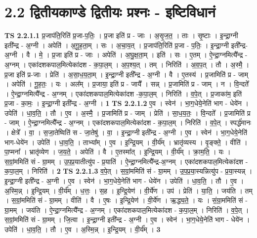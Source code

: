 \documentclass[17pt]{extarticle}
\begin{document}
\section*{ 2.2     द्वितीयकाण्डे द्वितीयः प्रश्नः - इष्टिविधानं }
                                \textbf{ TS 2.2.1.1} \newline
                  प्र॒जाप॑ति॒रिति॑ प्र॒जा-प॒तिः॒ । प्र॒जा इति॑ प्र - जाः । अ॒सृ॒ज॒त॒ । ताः । सृ॒ष्टाः । इ॒न्द्रा॒ग्नी इती᳚न्द्र - अ॒ग्नी । अपेति॑ । अ॒गू॒ह॒ता॒म् । सः । अ॒चा॒य॒त् । प्र॒जाप॑ति॒रिति॑ प्र॒जा - प॒तिः॒ । इ॒न्द्रा॒ग्नी इती᳚न्द्र-अ॒ग्नी । वै । मे॒ । प्र॒जा इति॑ प्र - जाः । अपेति॑ । अ॒घु॒क्ष॒ता॒म् । इति॑ । सः । ए॒तम् । ऐ॒न्द्रा॒ग्नमित्यै᳚न्द्र - अ॒ग्नम् । एका॑दशकपाल॒मित्येका॑दश - क॒पा॒ल॒म् । अ॒प॒श्य॒त् । तम् । निरिति॑ । अ॒व॒प॒त् । तौ । अ॒स्मै॒ । प्र॒जा इति॑ प्र-जाः । प्रेति॑ । अ॒सा॒ध॒य॒ता॒म् । इ॒न्द्रा॒ग्नी इती᳚न्द्र - अ॒ग्नी । वै । ए॒तस्य॑ । प्र॒जामिति॑ प्र - जाम् । अपेति॑ । गू॒ह॒तः॒ । यः । अल᳚म् । प्र॒जाया॒ इति॑ प्र - जायै᳚ । सन्न् । प्र॒जामिति॑ प्र - जाम् । न । वि॒न्दते᳚ । ऐ॒न्द्रा॒ग्नमित्यै᳚न्द्र - अ॒ग्नम् । एका॑दशकपाल॒मित्येका॑दश -क॒पा॒ल॒म् । निरिति॑ । व॒पे॒त् । प्र॒जाका॑म॒ इति॑ प्र॒जा - का॒मः॒ । इ॒न्द्रा॒ग्नी इती᳚न्द्र - अ॒ग्नी । \textbf{  1} \newline
                  \newline
                                \textbf{ TS 2.2.1.2} \newline
                  ए॒व । स्वेन॑ । भा॒ग॒धेये॒नेति॑ भाग - धेये॑न । उपेति॑ । धा॒व॒ति॒ । तौ । ए॒व । अ॒स्मै॒ । प्र॒जामिति॑ प्र - जाम् । प्रेति॑ । सा॒ध॒य॒तः॒ । वि॒न्दते᳚ । प्र॒जामिति॑ प्र - जाम् । ऐ॒न्द्रा॒ग्नमित्यै᳚न्द्र - अ॒ग्नम् । एका॑दशकपाल॒मित्येका॑दश - क॒पा॒ल॒म् । निरिति॑ । व॒पे॒त् । स्पर्द्ध॑मानः । क्षेत्रे᳚ । वा॒ । स॒जा॒तेष्विति॑ स - जा॒तेषु॑ । वा॒ । इ॒न्द्रा॒ग्नी इती᳚न्द्र - अ॒ग्नी । ए॒व । स्वेन॑ । भा॒ग॒धेये॒नेति॑ भाग-धेये॑न । उपेति॑ । धा॒व॒ति॒ । ताभ्या᳚म् । ए॒व । इ॒न्द्रि॒यम् । वी॒र्य᳚म् । भ्रातृ॑व्यस्य । वृ॒ङ्क्ते॒ । वीति॑ । पा॒प्मना᳚ । भ्रातृ॑व्येण । ज॒य॒ते॒ । अपेति॑ । वै । ए॒तस्मा᳚त् । इ॒न्द्रि॒यम् । वी॒र्य᳚म् । क्रा॒म॒ति॒ । यः । स॒ग्रां॒ममिति॑ सं - ग्रा॒मम् । उ॒प॒प्र॒यातीत्यु॑प - प्र॒याति॑ । ऐ॒न्द्रा॒ग्नमित्यै᳚न्द्र-अ॒ग्नम् । एका॑दशकपाल॒मित्येका॑दश - क॒पा॒ल॒म् । निरिति॑ । \textbf{  2} \newline
                  \newline
                                \textbf{ TS 2.2.1.3} \newline
                  व॒पे॒त् । स॒ग्रां॒ममिति॑ सं - ग्रा॒मम् । उ॒प॒प्र॒या॒स्यन्नित्यु॑प - प्र॒या॒स्यन्न् । इ॒न्द्रा॒ग्नी इती᳚न्द्र - अ॒ग्नी । ए॒व । स्वेन॑ । भा॒ग॒धेये॒नेति॑ भाग - धेये॑न । उपेति॑ । धा॒व॒ति॒ । तौ । ए॒व । अ॒स्मि॒न्न् । इ॒न्द्रि॒यम् । वी॒र्य᳚म् । ध॒त्तः॒ । स॒ह । इ॒न्द्रि॒येण॑ । वी॒र्ये॑ण । उप॑ । प्रेति॑ । या॒ति॒ । जय॑ति । तम् । स॒ग्रां॒ममिति॑ सं - ग्रा॒मम् । वीति॑ । वै । ए॒षः । इ॒न्द्रि॒येण॑ । वी॒र्ये॑ण । ऋ॒द्ध्य॒ते॒ । यः । सं॒ग्रा॒ममिति॑ सं - ग्रा॒मम् । जय॑ति । ऐ॒न्द्रा॒ग्नमित्यै᳚न्द्र - अ॒ग्नम् । एका॑दशकपाल॒मित्येका॑दश - क॒पा॒ल॒म् । निरिति॑ । व॒पे॒त् । स॒ग्रां॒ममिति॑ सं - ग्रा॒मम् । जि॒त्वा । इ॒न्द्रा॒ग्नी इती᳚न्द्र - अ॒ग्नी । ए॒व । स्वेन॑ । भा॒ग॒धेये॒नेति॑ भाग - धेये॑न । उपेति॑ । धा॒व॒ति॒ । तौ । ए॒व । अ॒स्मि॒न्न् । इ॒न्द्रि॒यम् । वी॒र्य᳚म् । \textbf{  3} \newline
\end{document}
